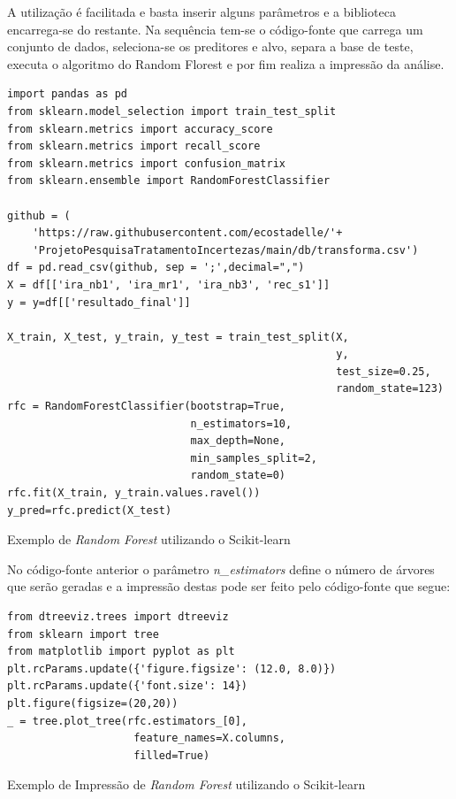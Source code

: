 \documentclass{article}
\begin{document}
A utilização é facilitada e basta inserir alguns parâmetros e a biblioteca encarrega-se do restante. Na sequência tem-se o código-fonte que carrega um conjunto de dados, seleciona-se os preditores e alvo, separa a base de teste, executa o algoritmo do Random Florest e por fim realiza a impressão da análise.


\begin{listing}[H]
\begin{verbatim}
import pandas as pd
from sklearn.model_selection import train_test_split
from sklearn.metrics import accuracy_score
from sklearn.metrics import recall_score
from sklearn.metrics import confusion_matrix
from sklearn.ensemble import RandomForestClassifier

github = (
    'https://raw.githubusercontent.com/ecostadelle/'+
    'ProjetoPesquisaTratamentoIncertezas/main/db/transforma.csv')
df = pd.read_csv(github, sep = ';',decimal=",")
X = df[['ira_nb1', 'ira_mr1', 'ira_nb3', 'rec_s1']]
y = y=df[['resultado_final']]

X_train, X_test, y_train, y_test = train_test_split(X, 
                                                    y, 
                                                    test_size=0.25, 
                                                    random_state=123)
rfc = RandomForestClassifier(bootstrap=True,
                             n_estimators=10,
                             max_depth=None,
                             min_samples_split=2,
                             random_state=0)
rfc.fit(X_train, y_train.values.ravel())
y_pred=rfc.predict(X_test)
\end{verbatim}
\caption{Exemplo de \emph{Random Forest} utilizando o Scikit-learn}
\end{listing}

No código-fonte anterior o parâmetro \textit{n\_estimators} define o número de árvores que serão geradas e a impressão destas pode ser feito pelo código-fonte que segue:

\begin{listing}[H]
\begin{verbatim}
from dtreeviz.trees import dtreeviz
from sklearn import tree
from matplotlib import pyplot as plt
plt.rcParams.update({'figure.figsize': (12.0, 8.0)})
plt.rcParams.update({'font.size': 14})
plt.figure(figsize=(20,20))
_ = tree.plot_tree(rfc.estimators_[0], 
                    feature_names=X.columns,
                    filled=True)
\end{verbatim}
\caption{Exemplo de Impressão de \emph{Random Forest} utilizando o Scikit-learn}
\end{listing}
\end{document}
